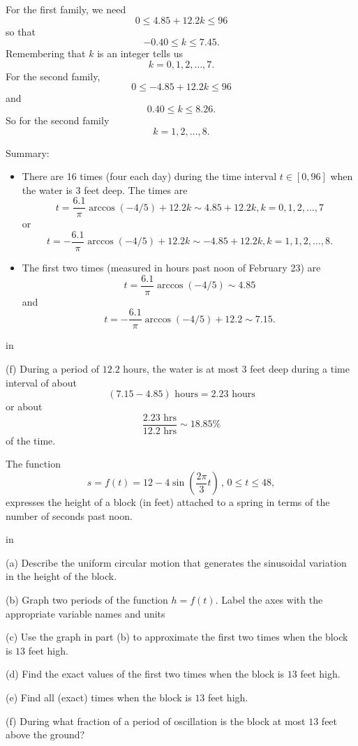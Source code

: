 \documentclass{ximera}
\newcommand{\pskip}{\vskip 0.1 in}
\begin{document}
\begin{example}
\begin{explanation}
For the first family, we need
\[
         0 \leq 4.85 + 12.2 k \leq 96
\]
so that
\[
      -0.40 \leq k \leq 7.45.
\]
Remembering that $k$ is an integer tells us
\[
   k = 0, 1, 2, \ldots ,7.
\]
For the second family,
\[
   0 \leq  - 4.85 + 12.2 k \leq 96
\]
and
\[
       0.40\leq k \leq 8.26 .
\]
So for the second family
\[
     k = 1, 2, \ldots , 8 .
\]

Summary:
\begin{itemize}
\item{There are 16 times (four each day) during the time interval $t\in [0,96]$ when the water is $3$ feet deep. The times are
\[
   t = \frac{6.1}{\pi}\arccos(-4/5) + 12.2k  \sim 4.85 + 12.2k ,  k=0, 1, 2, \ldots , 7
\]
or
\[
      t = -  \frac{6.1}{\pi}\arccos(-4/5) + 12.2k  \sim -4.85 + 12.2k ,  k=1, 1, 2, \ldots , 8.
\]}

\item{
The first two times (measured in hours past noon of February 23) are
\[
    t =  \frac{6.1}{\pi} \arccos(-4/5) \sim 4.85
\]
and 
\[
    t = - \frac{6.1}{\pi}\arccos(-4/5) + 12.2 \sim 7.15 .
\]
}
\end{itemize}

\pskip

(f) During a period of $12.2$ hours, the water is at most $3$ feet deep during a time interval of about
\[
   (7.15 - 4.85) \text { hours} = 2.23 \text{ hours}
\]
or about
\[
    \frac{2.23\text{ hrs}}{12.2 \text{ hrs}} \sim 18.85\%
\]
of the time.
\end{explanation}

\end{example}


\begin{question}  \label{Qert7u8gg}
The function
\[
    s  = f(t) = 12 - 4 \sin \left( \frac{2\pi}{3}t  \right) \, , \, 0\leq t \leq 48 ,
\]
expresses the height of a block (in feet) attached to a spring in terms of the number of seconds past noon.

\pskip

(a) Describe the uniform circular motion that generates the sinusoidal variation in the height of the block.

(b) Graph two periods of the function $h=f(t)$. Label the axes with the appropriate variable names and units

(c) Use the graph in part (b) to approximate the first two times when the block is $13$ feet high. 

(d) Find the exact values of the first two times when the block is $13$ feet high. 

(e) Find all (exact) times when the block is $13$ feet high. 

(f) During what fraction of a period of oscillation is the block at most $13$ feet above the ground?

\end{question}
\end{document}
